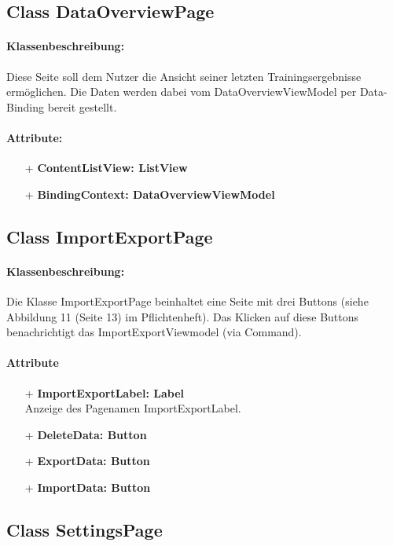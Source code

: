 \documentclass[a4paper,12pt]{article}
\begin{document}
	\subsection{Class DataOverviewPage}
		\paragraph{Klassenbeschreibung:}
		Diese Seite soll dem Nutzer die Ansicht seiner letzten Trainingsergebnisse ermöglichen.
		Die Daten werden dabei vom DataOverviewViewModel per Data-Binding bereit gestellt.
		\paragraph{Attribute:}
		\begin{itemize}
			\item[+] \textbf{ContentListView: ListView}
			\item[+] \textbf{BindingContext: DataOverviewViewModel} 
		\end{itemize}

	\subsection{Class ImportExportPage}
		\paragraph{Klassenbeschreibung:}
		Die Klasse ImportExportPage beinhaltet eine Seite mit drei Buttons (siehe Abbildung 11 (Seite 13) im Pflichtenheft).
		Das Klicken auf diese Buttons benachrichtigt das ImportExportViewmodel (via Command).
		\paragraph{Attribute}
		\begin{itemize}
			\item[+] \textbf{ImportExportLabel: Label} \\ Anzeige des Pagenamen ImportExportLabel.
			\item [+]\textbf{DeleteData: Button}
			\item [+]\textbf{ExportData: Button}
			\item [+]\textbf{ImportData: Button} %
		\end{itemize}

	\subsection{Class SettingsPage}
\end{document}
